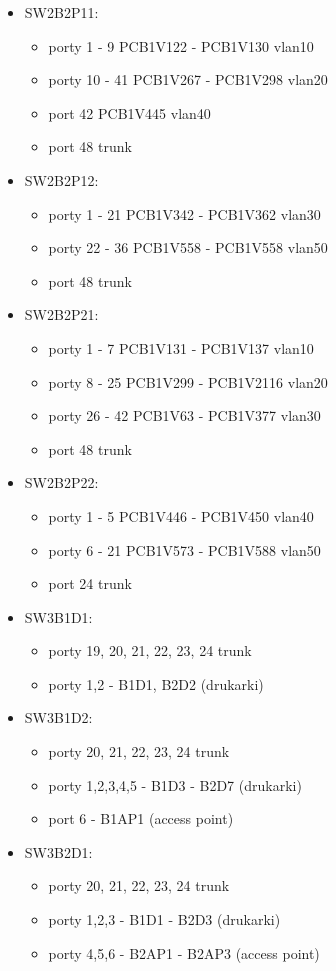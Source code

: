 \documentclass[a4paper, 12pt]{article}
\begin{document}
\begin{itemize}
\item SW2B2P11:
	\begin{itemize}
	\item porty 1 - 9 PCB1V122 - PCB1V130 vlan10
	\item porty 10 - 41 PCB1V267 - PCB1V298 vlan20
	\item port 42 PCB1V445 vlan40
	\item port 48 trunk
	\end{itemize}
	
\item SW2B2P12:
	\begin{itemize}
	\item porty 1 - 21 PCB1V342 - PCB1V362 vlan30
	\item porty 22 - 36 PCB1V558 - PCB1V558 vlan50
	\item port 48 trunk
	\end{itemize}
	
\item SW2B2P21:
	\begin{itemize}
	\item porty 1 - 7 PCB1V131 - PCB1V137 vlan10
	\item porty 8 - 25 PCB1V299 - PCB1V2116 vlan20
	\item porty 26 - 42 PCB1V63 - PCB1V377 vlan30
	\item port 48 trunk
	\end{itemize}
	
\item SW2B2P22:
	\begin{itemize}
	\item porty 1 - 5 PCB1V446 - PCB1V450 vlan40
	\item porty 6 - 21 PCB1V573 - PCB1V588 vlan50
	\item port 24 trunk
	\end{itemize}

\item SW3B1D1:
	\begin{itemize}
	\item porty 19, 20, 21, 22, 23, 24 trunk
	\item porty 1,2 - B1D1, B2D2 (drukarki)
	\end{itemize}
	
\item SW3B1D2:
	\begin{itemize}
	\item porty 20, 21, 22, 23, 24 trunk
	\item porty 1,2,3,4,5 - B1D3 - B2D7 (drukarki)
	\item port 6 - B1AP1 (access point)
	\end{itemize}
	
\item SW3B2D1:
	\begin{itemize}
	\item porty 20, 21, 22, 23, 24 trunk
	\item porty 1,2,3 - B1D1 - B2D3 (drukarki)
	\item porty 4,5,6 - B2AP1 - B2AP3 (access point)
	\end{itemize}
	
\end{itemize}
\end{document}
